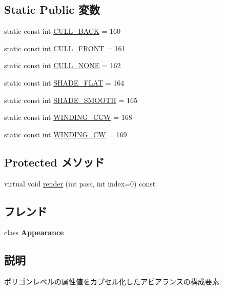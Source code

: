 \subsection*{Static Public 変数}
\begin{CompactItemize}
\item 
static const int \hyperlink{classm3g_1_1PolygonMode_34ae9162b765ddbc1d2476edf3195361}{CULL\_\-BACK} = 160
\item 
static const int \hyperlink{classm3g_1_1PolygonMode_efa180528b010979c6f7732c3c3114ae}{CULL\_\-FRONT} = 161
\item 
static const int \hyperlink{classm3g_1_1PolygonMode_48717ad405f481d0f2ab8e948bf86822}{CULL\_\-NONE} = 162
\item 
static const int \hyperlink{classm3g_1_1PolygonMode_5da32249eba3f6eb4366f016c424099e}{SHADE\_\-FLAT} = 164
\item 
static const int \hyperlink{classm3g_1_1PolygonMode_2da5e6696c8e910d9fca74b583a081df}{SHADE\_\-SMOOTH} = 165
\item 
static const int \hyperlink{classm3g_1_1PolygonMode_98d881cf813edf483860268535014210}{WINDING\_\-CCW} = 168
\item 
static const int \hyperlink{classm3g_1_1PolygonMode_86975b3dec0d6cc20f54fd82eb13ef9e}{WINDING\_\-CW} = 169
\end{CompactItemize}
\subsection*{Protected メソッド}
\begin{CompactItemize}
\item 
virtual void \hyperlink{classm3g_1_1PolygonMode_1efcb1973989d9963d5bd6d03065d389}{render} (int pass, int index=0) const 
\end{CompactItemize}
\subsection*{フレンド}
\begin{CompactItemize}
\item 
\hypertarget{classm3g_1_1PolygonMode_afa5201a494f65c37039281d9b63a2a9}{
class \textbf{Appearance}}
\label{classm3g_1_1PolygonMode_afa5201a494f65c37039281d9b63a2a9}

\end{CompactItemize}


\subsection{説明}
ポリゴンレベルの属性値をカプセル化したアピアランスの構成要素. 

